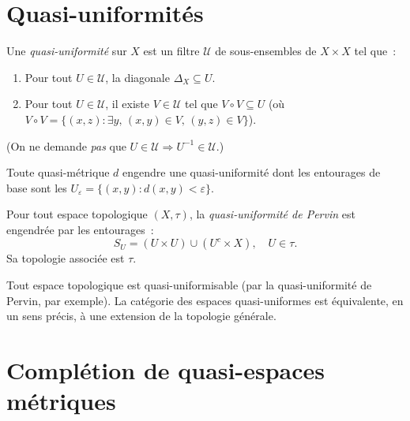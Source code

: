 \section{Quasi-uniformit\'es}

\begin{definition}
Une \emph{quasi-uniformit\'e} sur $X$ est un filtre $\mathcal{U}$ de sous-ensembles de
$X \times X$ tel que~:
\begin{enumerate}
  \item Pour tout $U \in \mathcal{U}$, la diagonale $\Delta_X \subseteq U$.
  \item Pour tout $U \in \mathcal{U}$, il existe $V \in \mathcal{U}$ tel que
    $V \circ V \subseteq U$ (o\`u $V \circ V = \{(x,z) : \exists y,\, (x,y) \in V,\,
    (y,z) \in V\}$).
\end{enumerate}
(On ne demande \emph{pas} que $U \in \mathcal{U} \Rightarrow U^{-1} \in \mathcal{U}$.)
\end{definition}

\begin{proposition}
Toute quasi-m\'etrique $d$ engendre une quasi-uniformit\'e dont les entourages de base
sont les $U_\varepsilon = \{(x,y) : d(x,y) < \varepsilon\}$.
\end{proposition}

\begin{definition}
Pour tout espace topologique $(X,\tau)$, la \emph{quasi-uniformit\'e de Pervin} est
engendr\'ee par les entourages~:
\[
  S_U = (U \times U) \cup (U^c \times X), \quad U \in \tau.
\]
Sa topologie associ\'ee est $\tau$.
\end{definition}

\begin{theoreme}
Tout espace topologique est quasi-uniformisable (par la quasi-uniformit\'e de Pervin, par
exemple). La cat\'egorie des espaces quasi-uniformes est \'equivalente, en un sens pr\'ecis,
\`a une extension de la topologie g\'en\'erale.
\end{theoreme}

\section{Compl\'etion de quasi-espaces m\'etriques}

